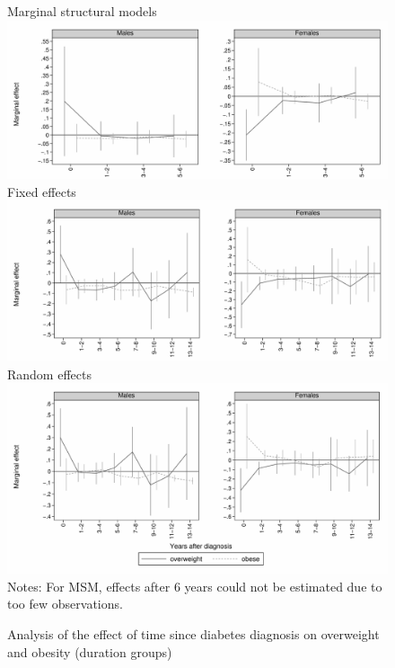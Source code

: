 \FloatBarrier
\clearpage

\begin{figure}
\begin{center}
\caption{\label{fig:obesity_duration_g} Analysis of the effect of time since diabetes diagnosis on overweight and obesity (duration groups)}
Marginal structural models
\includegraphics[width=\linewidth]{Chapter5/Figures/mi_msm_l_all_obese.pdf}
Fixed effects
\includegraphics[width=\linewidth]{Chapter5/Figures/mi_obese_fe.pdf}
Random effects
\includegraphics[width=\linewidth]{Chapter5/Figures/mi_obese_re.pdf}
\footnotesize{Notes: For MSM, effects after 6 years could not be estimated due to too few observations.}
\end{center}
\end{figure}
\clearpage